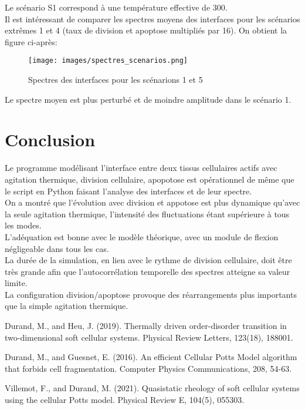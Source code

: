 \documentclass[11pt,a4paper]{article}
\begin{document}
Le scénario S1 correspond à une température effective de 300.\\

Il est intéressant de comparer les spectres moyens des interfaces pour les scénarios extrêmes 1 et 4 (taux de division et apoptose multipliés par 16). On obtient la figure ci-après:\\

\begin{figure}[H]
\begin{center}
\texttt{[image: images/spectres\_scenarios.png]}
\caption{Spectres des interfaces pour les scénarions 1 et 5}
\label{mafigure}
\end{center}
\end{figure}

Le spectre moyen est plus perturbé et de moindre amplitude dans le scénario 1.  \\



\section{Conclusion}

Le programme modélisant l'interface entre deux tissus cellulaires actifs avec agitation thermique, division cellulaire, apopotose est opérationnel de même que le script en Python faisant l'analyse des interfaces et de leur spectre.\\

On a montré que l'évolution avec division et appotose est plus dynamique qu'avec la seule agitation thermique, l'intensité des fluctuations étant supérieure à tous les modes.\\

L'adéquation est bonne avec le modèle théorique, avec un module de flexion négligeable dans tous les cas.\\

La durée de la simulation, en lien avec le rythme de division cellulaire, doit être très grande afin que l'autocorrélation temporelle des spectres atteigne sa valeur limite. \\

La configuration division/apoptose provoque des réarrangements plus importants que la simple agitation thermique.\\




\begin{thebibliography}{9}


\bibitem {}
Durand, M., and Heu, J. (2019). Thermally driven order-disorder transition in two-dimensional soft cellular systems. Physical Review Letters, 123(18), 188001.

\bibitem {}
Durand, M., and Guesnet, E. (2016). An efficient Cellular Potts Model algorithm that forbids cell fragmentation. Computer Physics Communications, 208, 54-63.

\bibitem {}
Villemot, F., and Durand, M. (2021). Quasistatic rheology of soft cellular systems using the cellular Potts model. Physical Review E, 104(5), 055303.


\end{thebibliography}
\end{document}

